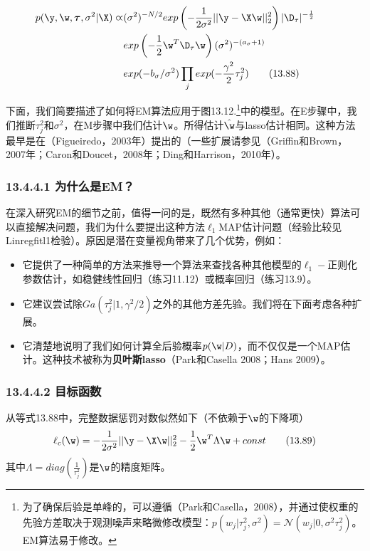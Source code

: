 \documentclass[a4paper]{article}
\begin{document}
\begin{align}
	p(\y,\w,\boldsymbol{\tau},\sigma^2|\X )\varpropto &(\sigma^2)^{-N/2}exp\left(-\frac{1}{2\sigma^2}||\y-\X\w||_2^2\right)|\D_\tau |^{-\frac{1}{2}}\tag*{}\\
	&exp\left(-\frac{1}{2}\w^T\D_\tau \w\right)(\sigma^2)^{-(a_\sigma+1)}\tag*{}\\
	&exp(-b_\sigma/\sigma^2)\prod_jexp(-\frac{\gamma^2}{2}\tau_j^2)\tag{13.88}
\end{align}

下面，我们简要描述了如何将EM算法应用于图13.12.\footnote{为了确保后验是单峰的，可以遵循（Park和Casella，2008），并通过使权重的先验方差取决于观测噪声来略微修改模型：$p(w_j|\tau_j^2,\sigma^2)=\mathcal{N}(w_j|0,\sigma^2\tau_j^2)$。EM算法易于修改。}中的模型。在E步骤中，我们推断$\tau_j^2$和$\sigma^2$，在M步骤中我们估计$\w$。所得估计$\hat{\w}$与lasso估计相同。这种方法最早是在（Figueiredo，2003年）提出的（一些扩展请参见（Griffin和Brown，2007年；Caron和Doucet，2008年；Ding和Harrison，2010年）。

\subsubsection*{13.4.4.1  为什么是EM？}
在深入研究EM的细节之前，值得一问的是，既然有多种其他（通常更快）算法可以直接解决问题，我们为什么要提出这种方法$\ell_1$MAP估计问题（经验比较见Linregfitl1检验）。原因是潜在变量视角带来了几个优势，例如：
\begin{itemize}
\item  它提供了一种简单的方法来推导一个算法来查找各种其他模型的$\ell_1-$正则化参数估计，如稳健线性回归（练习11.12）或概率回归（练习13.9）。
\item 它建议尝试除$Ga(\tau_j^2|1,\gamma^2/2)$之外的其他方差先验。我们将在下面考虑各种扩展。
\item 它清楚地说明了我们如何计算全后验概率$p(\w|D)$，而不仅仅是一个MAP估计。这种技术被称为\textbf{贝叶斯lasso}（Park和Casella 2008；Hans 2009）。
\end{itemize}

\subsubsection*{13.4.4.2  目标函数}
从等式13.88中，完整数据惩罚对数似然如下（不依赖于$\w$的下降项）
\begin{equation}
	\ell_c(\w)=-\frac{1}{2\sigma^2}||\y-\X\w||_2^2-\frac{1}{2}\w^T\Lambda\w+const\tag{13.89}
\end{equation}
其中$\Lambda=diag(\frac{1}{\tau_j^2})$是$\w$的精度矩阵。
\end{document}
